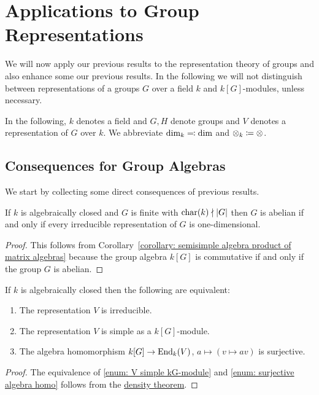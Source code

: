 \section{Applications to Group Representations}


\begin{fluff}
  We will now apply our previous results to the representation theory of groups and also enhance some our previous results.
  In the following we will not distinguish between representations of a groups $G$ over a field $k$ and $k[G]$-modules, unless necessary.
\end{fluff}


\begin{conventions}
  In the following, $k$ denotes a field and $G, H$ denote groups and $V$ denotes a representation of $G$ over $k$.
  We abbreviate $\dim_k \eqqcolon \dim$ and $\mathbin{\otimes}_k \coloneqq \mathbin{\otimes}$.
\end{conventions}





\subsection{Consequences for Group Algebras}


\begin{fluff}
  We start by collecting some direct consequences of previous results.
\end{fluff}


\begin{lemma}
  \label{lemma: every irrep is onedimen iff abelian}
  If $k$ is algebraically closed and $G$ is finite with $\operatorname{char}(k) \nmid |G|$ then $G$ is abelian if and only if every irreducible representation of $G$ is one-dimensional.
\end{lemma}


\begin{proof}
  This follows from Corollary~\ref{corollary: semisimple algebra product of matrix algebras} because the group algebra $k[G]$ is commutative if and only if the group $G$ is abelian.
\end{proof}


\begin{lemma}
  \label{lemma: equivalence to irreducible}
  If $k$ is algebraically closed then the following are equivalent:
  \begin{enumerate}
    \item \label{enum: V irreducible}
      The representation $V$ is irreducible.
    \item \label{enum: V simple kG-module}
      The representation $V$ is simple as a $k[G]$-module.
    \item \label{enum: surjective algebra homo}
      The algebra homomorphism $k[G] \to \operatorname{End}_k(V)$, $a \mapsto (v \mapsto av)$ is surjective.
  \end{enumerate}
\end{lemma}
\begin{proof}
  The equivalence of \ref*{enum: V simple kG-module} and \ref*{enum: surjective algebra homo} follows from the \hyperref[theorem: density theorem]{density theorem}.
\end{proof}


